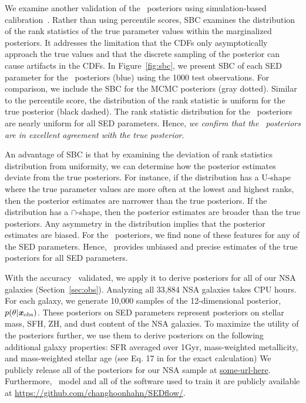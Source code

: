 We examine another validation of the \sedflow~posteriors using simulation-based
calibration~\citep[SBC;][]{talts2020}. 
Rather than using percentile scores, SBC examines the distribution of the rank
statistics of the true parameter values within the marginalized posteriors. 
It addresses the limitation that the CDFs only asymptotically approach the true
values and that the discrete sampling of the posterior can cause artifacts in
the CDFs. 
In Figure~\ref{fig:sbc}, we present SBC of each SED parameter for the
\sedflow~posteriors (blue) using the 1000 test observations.
For comparison, we include the SBC for the MCMC posteriors (gray dotted). 
Similar to the percentile score, the distribution of the rank statistic is
uniform for the true posterior (black dashed). 
The rank statistic distribution for the \sedflow~posteriors are nearly uniform
for all SED parameters. 
Hence, \emph{we confirm that the \sedflow~posteriors are in excellent agreement
with the true posterior}.

An advantage of SBC is that by examining the deviation of rank statistics
distribution from uniformity, we can determine how the posterior estimates
deviate from the true posteriors. 
For instance, if the distribution has a U-shape where the true parameter values
are more often at the lowest and highest ranks, then the posterior estimates
are narrower than the true posteriors.
If the distribution has a $\cap$-shape, then the posterior estimates are
broader than the true posteriors. 
Any asymmetry in the distribution implies that the posterior estimates are
biased.  
For the \sedflow~posteriors, we find none of these features for any of the SED
parameters. 
Hence, \sedflow~provides unbiased and precise estimates of the true posteriors
for all SED parameters. 

With the accuracy \sedflow~validated, we apply it to derive posteriors for all
of our NSA galaxies (Section~\ref{sec:obs}). 
Analyzing all 33,884 NSA galaxies takes  CPU hours. 
For each galaxy, we generate 10,000 samples of the 12-dimensional posterior,
$p(\theta | \textbf{\textit{x}}_{\rm obs})$. 
These posteriors on SED parameters represent posteriors on stellar mass, SFH,
ZH, and dust content of the NSA galaxies. 
To maximize the utility of the posteriors further, we use them to derive
posteriors on the following additional galaxy properties: SFR averaged over
1Gyr, mass-weighted metallicity, and mass-weighted stellar age (see
Eq. 17 in \citealt{hahn2022} for the exact calculation)
We publicly release all of the posteriors for our NSA sample at 
\url{some-url-here}. 
Furthermore, \sedflow~model and all of the software used to train it are
publicly available at \url{https://github.com/changhoonhahn/SEDflow/}. 
